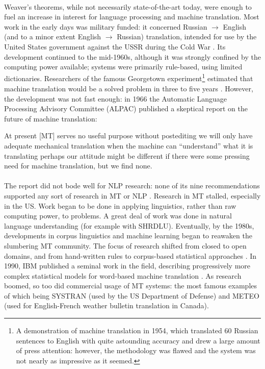 \paragraph{}{Weaver's theorems, while not necessarily state-of-the-art
  today, were enough to fuel an increase in interest for language
  processing and machine translation. Most work in the early days was
  military funded: it concerned Russian $\rightarrow$ English (and to
  a minor extent English $\rightarrow$ Russian) translation, intended for use by the
  United States government against the USSR during the Cold War
  \cite{retro}. Its development continued to the mid-1960s, although
  it was strongly confined by the computing power available; systems
  were primarily rule-based, using limited dictionaries. Researchers
  of the famous Georgetown experiment\footnote{A demonstration of
    machine translation in 1954, which translated 60 Russian sentences
    to English with quite astounding accuracy and drew a large amount
    of press attention: however, the methodology was flawed and the
    system was not nearly as impressive as it seemed.} estimated that
  machine translation would be a solved problem in three to five years
  \cite{georgetown}. However, the development was not fast enough: in
  1966 the Automatic Language Processing Advisory Committee (ALPAC)
  published a skeptical report on the future of machine
  translation\cite{alpac}:}
\begin{displayquote}
  At present [MT] serves no useful purpose without postediting
  \textelp{} we will only have adequate mechanical translation when the
  machine can ``understand'' what it is translating \textelp{} perhaps our
  attitude might be different if there were some pressing need for
  machine translation, but we find none.
\end{displayquote}

\paragraph{}{The report did not bode well for NLP research: none of
  its nine recommendations supported any sort of research in MT or NLP
  \cite{alpac-crit}. Research in MT stalled, especially in the
  US. Work began to be done in applying linguistics, rather than raw
  computing power, to problems. A great deal of work was done in
  natural language understanding (for example with
  SHRDLU\cite{shrdlu}). Eventually, by the 1980s, developments in
  corpus linguistics and machine learning began to reawaken the
  slumbering MT community. The focus of research shifted from closed
  to open domains, and from hand-written rules to corpus-based
  statistical approaches \cite{shift}. In 1990, IBM published a
  seminal work in the field, describing progressively more complex
  statistical models for word-based machine translation \cite{ibm}. As
  research boomed, so too did commercial usage of MT systems: the most
  famous examples of which being SYSTRAN (used by the US Department of
  Defense) and METEO (used for English-French weather bulletin
  translation in Canada). }

